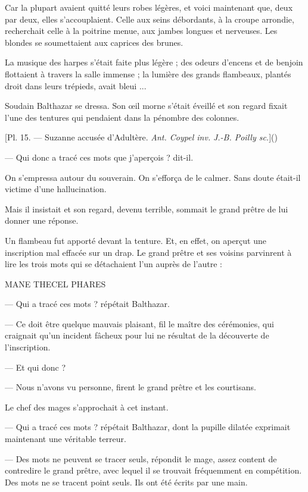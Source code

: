 \documentclass[a4paper, 11pt, oneside, polutonikogreek, french]{article}
\begin{document}
Car la plupart avaient quitté leurs robes légères, et voici maintenant que, deux par deux, elles s'accouplaient. Celle aux seins débordants, à la croupe arrondie, recherchait celle à la poitrine menue, aux jambes longues et nerveuses. Les blondes se soumettaient aux caprices des brunes.

La musique des harpes s'était faite plus légère ; des odeurs d'encens et de benjoin flottaient à travers la salle immense ; la lumière des grands flambeaux, plantés droit dans leurs trépieds, avait bleui ...

\bigskip
\centerline{\EightStarTaper}
\centerline{\EightStarTaper\EightStarTaper}
\bigskip

Soudain Balthazar se dressa. Son œil morne s'était éveillé et son regard fixait l'une des tentures qui pendaient dans la pénombre des colonnes.

[Pl. 15. --- Suzanne accusée d'Adultère. \emph{Ant. Coypel inv.} \emph{J.-B. Poilly sc.}]()

--- Qui donc a tracé ces mots que j'aperçois ? dit-il.

On s'empressa autour du souverain. On s'efforça de le calmer. Sans doute était-il victime d'une hallucination.

Mais il insistait et son regard, devenu terrible, sommait le grand prêtre de lui donner une réponse.

Un flambeau fut apporté devant la tenture. Et, en effet, on aperçut une inscription mal effacée sur un drap. Le grand prêtre et ses voisins parvinrent à lire les trois mots qui se détachaient l'un auprès de l'autre :

MANE THECEL PHARES

--- Qui a tracé ces mots ? répétait Balthazar.

--- Ce doit être quelque mauvais plaisant, fil le maître des cérémonies, qui craignait qu'un incident fâcheux pour lui ne résultat de la découverte de l'inscription.

--- Et qui donc ?

--- Nous n'avons vu personne, firent le grand prêtre et les courtisans.

Le chef des mages s'approchait à cet instant.

--- Qui a tracé ces mots ? répétait Balthazar, dont la pupille dilatée exprimait maintenant une véritable terreur.

--- Des mots ne peuvent se tracer seuls, répondit le mage, assez content de contredire le grand prêtre, avec lequel il se trouvait fréquemment en compétition. Des mots ne se tracent point seuls. Ils ont été écrits par une main.
\end{document}
